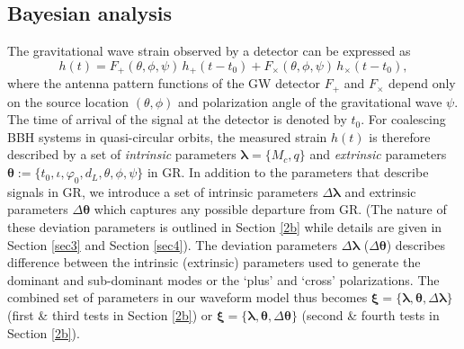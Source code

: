 \documentclass[prd,preprintnumbers,twocolumn,eqsecnum,floatfix,a4paper,nofootinbib,superscriptaddress]{revtex4}
\newcommand{\blambda}{\bm{\lambda}}
\newcommand{\btheta}{\bm{\theta}}
\newcommand{\bxi}{\bm{\xi}}
\begin{document}
\subsection{Bayesian analysis}
The gravitational wave strain observed by a detector can be expressed as
\begin{equation}
h(t) = F_+(\theta, \phi, \psi) \, h_+(t-t_0) + F_{\times}(\theta, \phi, \psi)\, {h}_{\times}(t-t_0), 
\label{eq:det_response}
\end{equation}
where the antenna pattern functions of the GW detector $F_+$ and $F_\times$  depend only on the source location $(\theta, \phi)$ and polarization angle of the gravitational wave $\psi$.  The time of arrival of the signal at the detector is denoted by $t_0$. For coalescing BBH systems in quasi-circular orbits, the measured strain $h(t)$ is therefore described by a set of \emph{intrinsic} parameters $\blambda = \{M_c, q\}$ and \emph{extrinsic} parameters  $\btheta := \{t_0, \iota, \varphi_0, d_L, \theta, \phi, \psi\}$ in GR. In addition to the parameters that describe signals in GR, we introduce a set of intrinsic parameters $\Delta \blambda$ and extrinsic parameters $\Delta \btheta$  which captures any possible departure from GR.  (The nature of these deviation parameters is outlined in Section \ref{2b} while details are given in Section \ref{sec3} and Section \ref{sec4}). The deviation parameters $\Delta \blambda$ ($\Delta \btheta$) describes difference between the intrinsic (extrinsic) parameters used to generate the dominant and sub-dominant modes or the `plus' and `cross' polarizations. The combined set of parameters in our waveform model thus becomes $\bxi = \{\blambda, \btheta, \Delta \blambda\}$ (first \& third tests in Section \ref{2b}) or $\bxi = \{\blambda, \btheta, \Delta \btheta\}$ (second \& fourth tests in Section \ref{2b}). 
\end{document}
